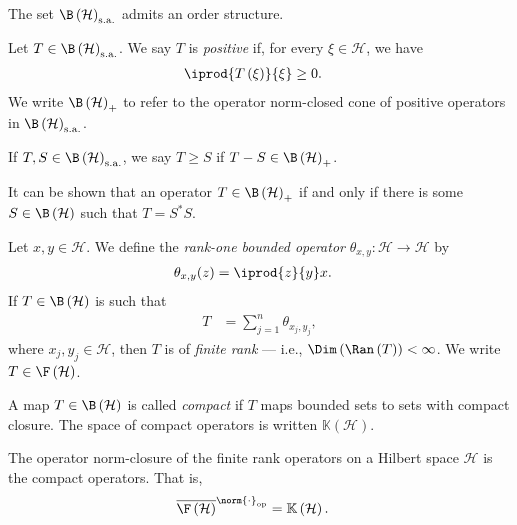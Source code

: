 The set $\B\left(\mathcal{H}\right)_{\sa}$ admits an order structure.
\begin{definition}\label{def:positive_operators}
  Let $T\in \B\left(\mathcal{H}\right)_{\sa}$. We say $T$ is \textit{positive} if, for every $\xi\in \mathcal{H}$, we have
  \begin{align*}
    \iprod{T\left(\xi\right)}{\xi} &\geq 0.
  \end{align*}
  We write $\B\left(\mathcal{H}\right)_{+}$ to refer to the operator norm-closed cone of positive operators in $\B\left(\mathcal{H}\right)_{\sa}$.\newline

  If $T,S\in \B\left(\mathcal{H}\right)_{\sa}$, we say $T\geq S$ if $T-S \in \B\left(\mathcal{H}\right)_{+}$.
\end{definition}
\begin{remark}\label{rem:positive_operators_definition}
  It can be shown that an operator $T\in \B\left(\mathcal{H}\right)_{+}$ if and only if there is some $S\in \B\left(\mathcal{H}\right)$ such that $T = S^{\ast}S$.
\end{remark}
\begin{definition}
  Let $x,y\in \mathcal{H}$. We define the \textit{rank-one bounded operator} $\theta_{x,y}\colon \mathcal{H}\rightarrow \mathcal{H}$ by
  \begin{align*}
    \theta_{x,y}(z) &= \iprod{z}{y}x.
  \end{align*}
  If $T\in \B\left(\mathcal{H}\right)$ is such that
  \begin{align*}
    T &= \sum_{j=1}^{n}\theta_{x_j,y_j},
  \end{align*}
  where $x_j,y_j\in \mathcal{H}$, then $T$ is of \textit{finite rank} --- i.e., $\Dim\left(\Ran\left(T\right)\right) < \infty$. We write $T\in \F\left(\mathcal{H}\right)$.\newline

  A map $T\in \B\left(\mathcal{H}\right)$ is called \textit{compact} if $T$ maps bounded sets to sets with compact closure. The space of compact operators is written $\mathbb{K}\left(\mathcal{H}\right)$.
\end{definition}
\begin{theorem}
  The operator norm-closure of the finite rank operators on a Hilbert space $\mathcal{H}$ is the compact operators. That is,
  \begin{align*}
    \overline{\F\left(\mathcal{H}\right)}^{\norm{\cdot}_{\op}} &= \mathbb{K}\left(\mathcal{H}\right).
  \end{align*}
\end{theorem}
